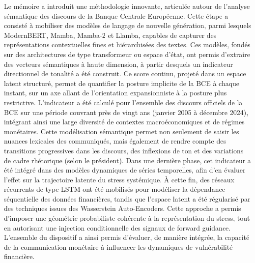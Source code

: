 Le mémoire a introduit une méthodologie innovante, articulée autour de l’analyse sémantique des discours de la Banque Centrale Européenne. Cette étape a consisté à mobiliser des modèles de langage de nouvelle génération, parmi lesquels ModernBERT, Mamba, Mamba-2 et Llamba, capables de capturer des représentations contextuelles fines et hiérarchisées des textes. Ces modèles, fondés sur des architectures de type transformeur ou espace d’état, ont permis d’extraire des vecteurs sémantiques à haute dimension, à partir desquels un indicateur directionnel de tonalité a été construit. Ce score continu, projeté dans un espace latent structuré, permet de quantifier la posture implicite de la BCE à chaque instant, sur un axe allant de l’orientation expansionniste à la posture plus restrictive. L’indicateur a été calculé pour l’ensemble des discours officiels de la BCE sur une période couvrant près de vingt ans (janvier 2005 à décembre 2024), intégrant ainsi une large diversité de contextes macroéconomiques et de régimes monétaires. Cette modélisation sémantique permet non seulement de saisir les nuances lexicales des communiqués, mais également de rendre compte des transitions progressives dans les discours, des inflexions de ton et des variations de cadre rhétorique (selon le président). Dans une dernière phase, cet indicateur a été intégré dans des modèles dynamiques de séries temporelles, afin d’en évaluer l’effet sur la trajectoire latente du stress systémique. À cette fin, des réseaux récurrents de type LSTM ont été mobilisés pour modéliser la dépendance séquentielle des données financières, tandis que l’espace latent a été régularisé par des techniques issues des Wasserstein Auto-Encoders. Cette approche a permis d’imposer une géométrie probabiliste cohérente à la représentation du stress, tout en autorisant une injection conditionnelle des signaux de forward guidance. L’ensemble du dispositif a ainsi permis d’évaluer, de manière intégrée, la capacité de la communication monétaire à influencer les dynamiques de vulnérabilité financière.\\

